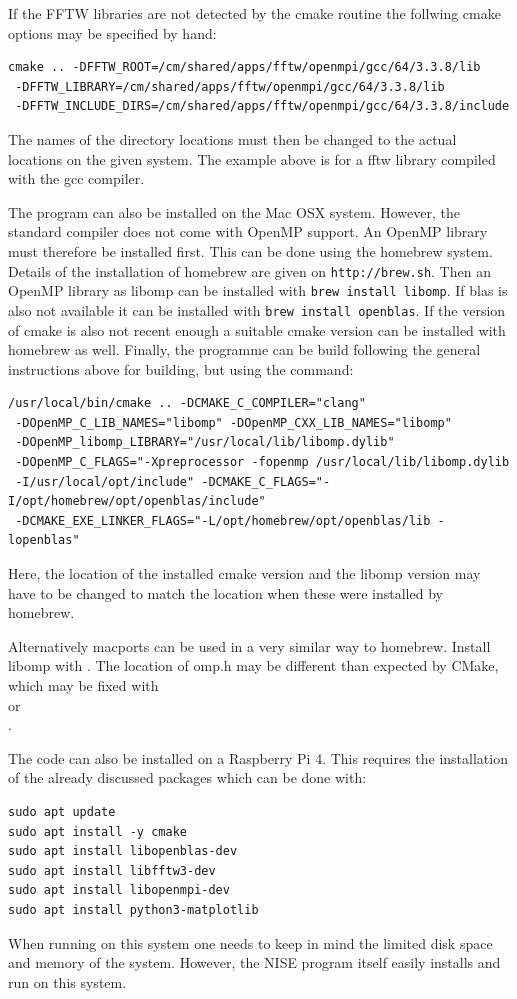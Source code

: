 If the FFTW libraries are not detected by the cmake routine the follwing cmake options
may be specified by hand:
\begin{lstlisting}[style=mystyle]
cmake .. -DFFTW_ROOT=/cm/shared/apps/fftw/openmpi/gcc/64/3.3.8/lib
 -DFFTW_LIBRARY=/cm/shared/apps/fftw/openmpi/gcc/64/3.3.8/lib
 -DFFTW_INCLUDE_DIRS=/cm/shared/apps/fftw/openmpi/gcc/64/3.3.8/include
\end{lstlisting}
The names of the directory locations must then be changed to the actual locations on
the given system. The example above is for a fftw library compiled with the gcc
compiler.

The program can also be installed on the Mac OSX system. However, the standard
compiler does not come with OpenMP support. An OpenMP library must therefore be
installed first. This can be done using the homebrew system. Details of the
installation of homebrew are given on \texttt{http://brew.sh}. Then an OpenMP library
as libomp can be installed with \texttt{brew install libomp}. If blas is also not
available it can be installed with \texttt{brew install openblas}. If the version of
cmake is also not recent enough a suitable cmake version can be installed with
homebrew as well. Finally, the programme can be build following the general
instructions above for building, but using the command:
\begin{lstlisting}[style=mystyle]
/usr/local/bin/cmake .. -DCMAKE_C_COMPILER="clang"
 -DOpenMP_C_LIB_NAMES="libomp" -DOpenMP_CXX_LIB_NAMES="libomp"
 -DOpenMP_libomp_LIBRARY="/usr/local/lib/libomp.dylib"
 -DOpenMP_C_FLAGS="-Xpreprocessor -fopenmp /usr/local/lib/libomp.dylib
 -I/usr/local/opt/include" -DCMAKE_C_FLAGS="-I/opt/homebrew/opt/openblas/include"
 -DCMAKE_EXE_LINKER_FLAGS="-L/opt/homebrew/opt/openblas/lib -lopenblas"
\end{lstlisting}
Here, the location of the installed cmake version and the libomp version may have to
be changed to match the location when these were installed by homebrew.

Alternatively macports can be used in a very similar way to homebrew. Install libomp
with . The location of omp.h may be different than
expected by CMake, which may be fixed with\\
 or\\
.

The code can also be installed on a Raspberry Pi 4. This requires the installation of
the already discussed packages which can be done with:
\begin{lstlisting}[style=mystyle]
sudo apt update
sudo apt install -y cmake
sudo apt install libopenblas-dev
sudo apt install libfftw3-dev
sudo apt install libopenmpi-dev
sudo apt install python3-matplotlib
\end{lstlisting}
When running on this system one needs to keep in mind the limited disk space and memory
of the system. However, the NISE program itself easily installs and run on this system.


